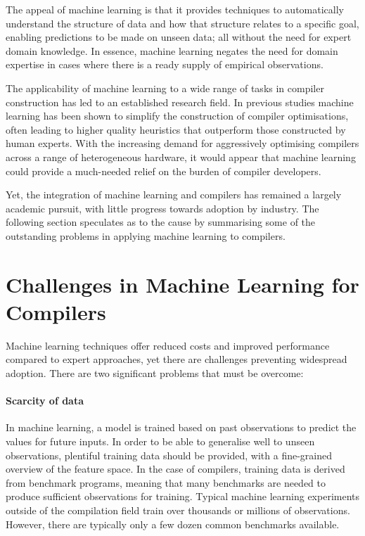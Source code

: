 The appeal of machine learning is that it provides techniques to automatically understand the structure of data and how that structure relates to a specific goal, enabling predictions to be made on unseen data; all without the need for expert domain knowledge. In essence, machine learning negates the need for domain expertise in cases where there is a ready supply of empirical observations.

The applicability of machine learning to a wide range of tasks in compiler construction has led to an established research field. In previous studies machine learning has been shown to simplify the construction of compiler optimisations, often leading to higher quality heuristics that outperform those constructed by human experts. With the increasing demand for aggressively optimising compilers across a range of heterogeneous hardware, it would appear that machine learning could provide a much-needed relief on the burden of compiler developers.

Yet, the integration of machine learning and compilers has remained a largely academic pursuit, with little progress towards adoption by industry. The following section speculates as to the cause by summarising some of the outstanding problems in applying machine learning to compilers.


\section{Challenges in Machine Learning for Compilers}


Machine learning techniques offer reduced costs and improved performance compared to expert approaches, yet there are challenges preventing widespread adoption. There are two significant problems that must be overcome:

\paragraph*{Scarcity of data} In machine learning, a model is trained based on past observations to predict the values for future inputs. In order to be able to generalise well to unseen observations, plentiful training data should be provided, with a fine-grained overview of the feature space. In the case of compilers, training data is derived from benchmark programs, meaning that many benchmarks are needed to produce sufficient observations for training. Typical machine learning experiments outside of the compilation field train over thousands or millions of observations. However, there are typically only a few dozen common benchmarks available.

